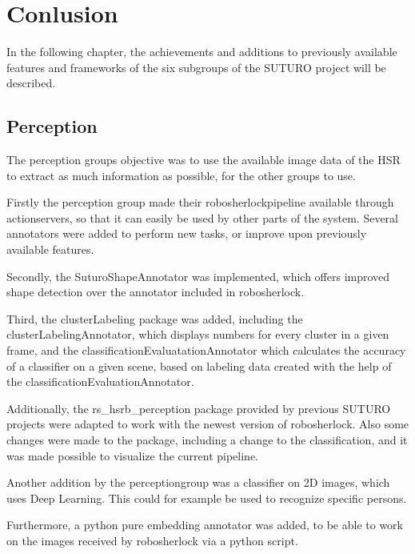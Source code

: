 \documentclass[main.tex]{subfiles}
\begin{document}
	\begingroup

	\renewcommand{\cleardoublepage}{}

	\renewcommand{\clearpage}{}

	\chapter{Conlusion}
		In the following chapter, the achievements and additions to previously available features and frameworks of the six subgroups of the SUTURO project will be described.
		
		\section{Perception}
		The perception groups objective was to use the available image data of the HSR to extract as much information as possible, for the other groups to use.
				
		Firstly the perception group made their robosherlockpipeline available through actionservers, so that it can easily be used by other parts of the system. Several annotators were added to perform new tasks, or improve upon previously available features. 
		
		Secondly, the SuturoShapeAnnotator was implemented, which offers improved shape detection over the annotator included in robosherlock. 
		
		Third, the clusterLabeling package was added, including the clusterLabelingAnnotator, which displays numbers for every cluster in a given frame, and the classificationEvaluatationAnnotator which calculates the accuracy of a classifier on a given scene, based on labeling data created with the help of the classificationEvaluationAnnotator. 
		
		Additionally, the rs\_hsrb\_perception package provided by previous SUTURO projects were adapted to work with the newest version of robosherlock. Also some changes were made to the package, including a change to the classification, and it was made possible to visualize the current pipeline.
		
		Another addition by the perceptiongroup was a classifier on 2D images, which uses Deep Learning. This could for example be used to recognize specific persons.
		
		Furthermore, a python pure embedding annotator was added, to be able to work on the images received by robosherlock via a python script.
		
\end{document}
